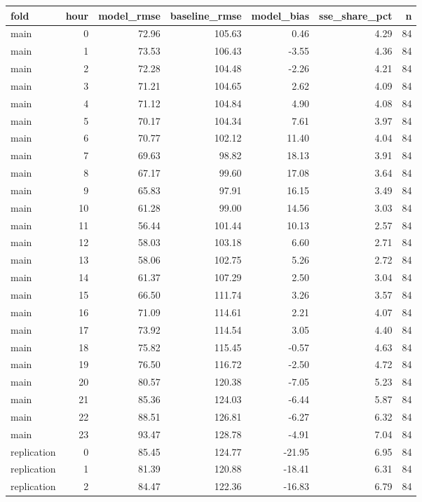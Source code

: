 \begin{tabular}{lrrrrrr}
\toprule
fold & hour & model\_rmse & baseline\_rmse & model\_bias & sse\_share\_pct & n \\
\midrule
main & 0 & 72.96 & 105.63 & 0.46 & 4.29 & 84 \\
main & 1 & 73.53 & 106.43 & -3.55 & 4.36 & 84 \\
main & 2 & 72.28 & 104.48 & -2.26 & 4.21 & 84 \\
main & 3 & 71.21 & 104.65 & 2.62 & 4.09 & 84 \\
main & 4 & 71.12 & 104.84 & 4.90 & 4.08 & 84 \\
main & 5 & 70.17 & 104.34 & 7.61 & 3.97 & 84 \\
main & 6 & 70.77 & 102.12 & 11.40 & 4.04 & 84 \\
main & 7 & 69.63 & 98.82 & 18.13 & 3.91 & 84 \\
main & 8 & 67.17 & 99.60 & 17.08 & 3.64 & 84 \\
main & 9 & 65.83 & 97.91 & 16.15 & 3.49 & 84 \\
main & 10 & 61.28 & 99.00 & 14.56 & 3.03 & 84 \\
main & 11 & 56.44 & 101.44 & 10.13 & 2.57 & 84 \\
main & 12 & 58.03 & 103.18 & 6.60 & 2.71 & 84 \\
main & 13 & 58.06 & 102.75 & 5.26 & 2.72 & 84 \\
main & 14 & 61.37 & 107.29 & 2.50 & 3.04 & 84 \\
main & 15 & 66.50 & 111.74 & 3.26 & 3.57 & 84 \\
main & 16 & 71.09 & 114.61 & 2.21 & 4.07 & 84 \\
main & 17 & 73.92 & 114.54 & 3.05 & 4.40 & 84 \\
main & 18 & 75.82 & 115.45 & -0.57 & 4.63 & 84 \\
main & 19 & 76.50 & 116.72 & -2.50 & 4.72 & 84 \\
main & 20 & 80.57 & 120.38 & -7.05 & 5.23 & 84 \\
main & 21 & 85.36 & 124.03 & -6.44 & 5.87 & 84 \\
main & 22 & 88.51 & 126.81 & -6.27 & 6.32 & 84 \\
main & 23 & 93.47 & 128.78 & -4.91 & 7.04 & 84 \\
replication & 0 & 85.45 & 124.77 & -21.95 & 6.95 & 84 \\
replication & 1 & 81.39 & 120.88 & -18.41 & 6.31 & 84 \\
replication & 2 & 84.47 & 122.36 & -16.83 & 6.79 & 84 \\

\end{tabular}
